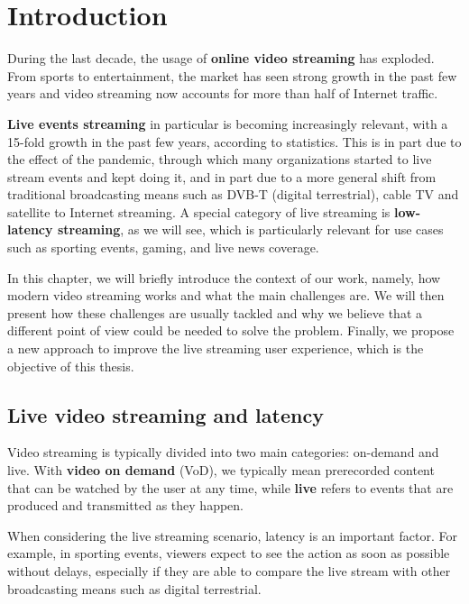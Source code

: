 
\chapter{Introduction}
\label{cha:intro}

During the last decade, the usage of \textbf{online video streaming} has exploded. From sports to entertainment, the market has seen strong growth in the past few years and video streaming now accounts for more than half of Internet traffic.\cite{cisco2019}

\textbf{Live events streaming} in particular is becoming increasingly relevant, with a 15-fold growth in the past few years, according to statistics. This is in part due to the effect of the pandemic, through which many organizations started to live stream events and kept doing it, and in part due to a more general shift from traditional broadcasting means such as DVB-T (digital terrestrial), cable TV and satellite to Internet streaming. A special category of live streaming is \textbf{low-latency streaming}, as we will see, which is particularly relevant for use cases such as sporting events, gaming, and live news coverage.

In this chapter, we will briefly introduce the context of our work, namely, how modern video streaming works and what the main challenges are. We will then present how these challenges are usually tackled and why we believe that a different point of view could be needed to solve the problem. Finally, we propose a new approach to improve the live streaming user experience, which is the objective of this thesis.

\section{Live video streaming and latency}
\label{sec:intro/live}

Video streaming is typically divided into two main categories: on-demand and live. With \textbf{video on demand} (VoD), we typically mean prerecorded content that can be watched by the user at any time, while \textbf{live} refers to events that are produced and transmitted as they happen.

When considering the live streaming scenario, latency is an important factor. For example, in sporting events, viewers expect to see the action as soon as possible without delays, especially if they are able to compare the live stream with other broadcasting means such as digital terrestrial.

